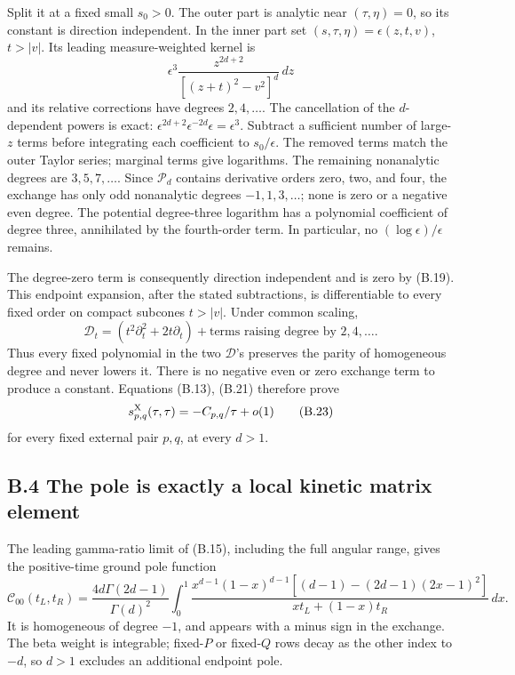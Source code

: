 \documentclass[a4paper,11pt]{article}
\numberwithin{equation}{section}
\begin{document}
Split it at a fixed small \(s_0>0\). The outer part is analytic near \((\tau,\eta)=0\), so its constant is direction independent. In the inner part set \((s,\tau,\eta)=\epsilon(z,t,v)\), \(t>|v|\). Its leading measure-weighted kernel is \[
\epsilon^3\frac{z^{2d+2}}{[(z+t)^2-v^2]^d}\,dz
\] and its relative corrections have degrees \(2,4,\ldots\). The cancellation of the \(d\)-dependent powers is exact: \(\epsilon^{2d+2}\epsilon^{-2d}\epsilon=\epsilon^3\). Subtract a sufficient number of large-\(z\) terms before integrating each coefficient to \(s_0/\epsilon\). The removed terms match the outer Taylor series; marginal terms give logarithms. The remaining nonanalytic degrees are \(3,5,7,\ldots\). Since \(\mathcal P_d\) contains derivative orders zero, two, and four, the exchange has only odd nonanalytic degrees \(-1,1,3,\ldots\); none is zero or a negative even degree. The potential degree-three logarithm has a polynomial coefficient of degree three, annihilated by the fourth-order term. In particular, no \((\log\epsilon)/\epsilon\) remains.

The degree-zero term is consequently direction independent and is zero by (B.19). This endpoint expansion, after the stated subtractions, is differentiable to every fixed order on compact subcones \(t>|v|\). Under common scaling, \[
\mathscr D_t=(t^2\partial_t^2+2t\partial_t)
+\text{terms raising degree by }2,4,\ldots .
\tag{B.22}
\] Thus every fixed polynomial in the two \(\mathscr D\)'s preserves the parity of homogeneous degree and never lowers it. There is no negative even or zero exchange term to produce a constant. Equations (B.13), (B.21) therefore prove \[
s^{\rm X}_{p,q}(\tau,\tau)=-C_{p,q}/\tau+o(1)
\tag{B.23}
\] for every fixed external pair \(p,q\), at every \(d>1\).

\hypertarget{b.4-the-pole-is-exactly-a-local-kinetic-matrix-element}{%
\subsection{B.4 The pole is exactly a local kinetic matrix element}\label{b.4-the-pole-is-exactly-a-local-kinetic-matrix-element}}

The leading gamma-ratio limit of (B.15), including the full angular range, gives the positive-time ground pole function \[
\mathcal C_{00}(t_L,t_R)
=\frac{4d\Gamma(2d-1)}{\Gamma(d)^2}
\int_0^1
\frac{x^{d-1}(1-x)^{d-1}
[(d-1)-(2d-1)(2x-1)^2]}
{xt_L+(1-x)t_R}\,dx .
\tag{B.24}
\] It is homogeneous of degree \(-1\), and appears with a minus sign in the exchange. The beta weight is integrable; fixed-\(P\) or fixed-\(Q\) rows decay as the other index to \(-d\), so \(d>1\) excludes an additional endpoint pole.
\end{document}
